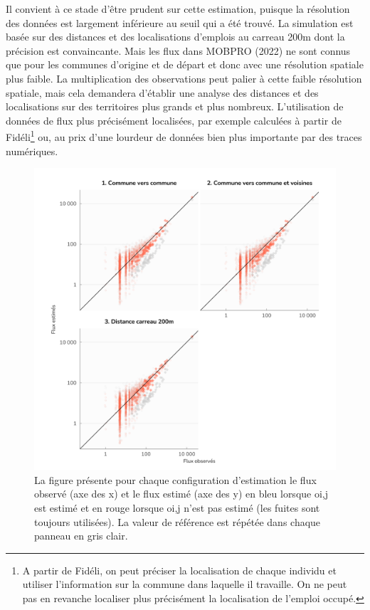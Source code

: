 \documentclass[
  10pt,
  a4paper,
  numbers=noendperiod,
  DIV=9]{scrreprt}
\begin{document}
Il convient à ce stade d'être prudent sur cette estimation, puisque la
résolution des données est largement inférieure au seuil qui a été
trouvé. La simulation est basée sur des distances et des localisations
d'emplois au carreau 200m dont la précision est convaincante. Mais les
flux dans MOBPRO (2022) ne sont connus que pour les communes d'origine
et de départ et donc avec une résolution spatiale plus faible. La
multiplication des observations peut palier à cette faible résolution
spatiale, mais cela demandera d'établir une analyse des distances et des
localisations sur des territoires plus grands et plus nombreux.
L'utilisation de données de flux plus précisément localisées, par
exemple calculées à partir de Fidéli\footnote{A partir de Fidéli, on
  peut préciser la localisation de chaque individu et utiliser
  l'information sur la commune dans laquelle il travaille. On ne peut
  pas en revanche localiser plus précisément la localisation de l'emploi
  occupé.} ou, au prix d'une lourdeur de données bien plus importante
par des traces numériques.

\begin{figure}[htb]

{\centering \includegraphics[width=1\textwidth,height=\textheight]{./larochelle_files/figure-pdf/fig-actvsfit-p-1.png}

}

\caption[\emph{MEAPS} observés versus estimés, estimations
paramétriques]{\label{fig-actvsfit-p}La figure présente pour chaque
configuration d'estimation le flux observé (axe des x) et le flux estimé
(axe des y) en bleu lorsque oi,j est estimé et en rouge lorsque oi,j
n'est pas estimé (les fuites sont toujours utilisées). La valeur de
référence est répétée dans chaque panneau en gris clair.}

\end{figure}
\end{document}
